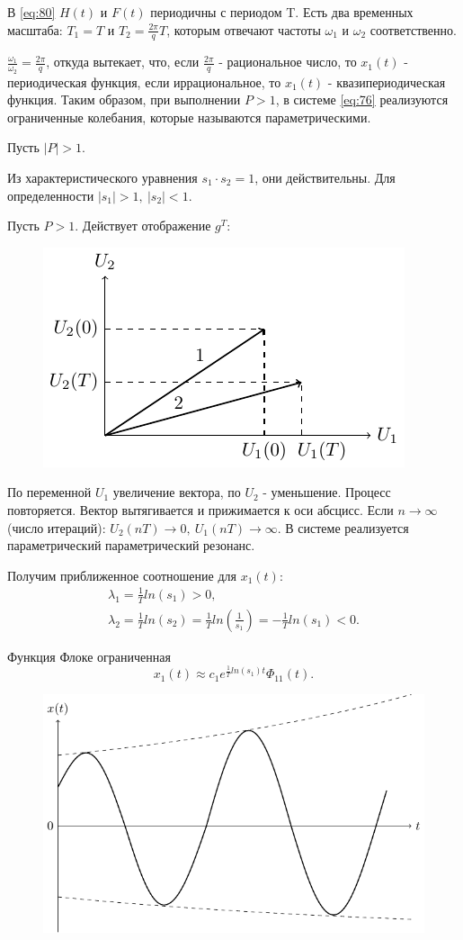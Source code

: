 В \eqref{eq:80} $H(t)$ и $F(t)$ периодичны с периодом T. Есть два временных масштаба: $T_1=T$ и $T_2=\frac{2\pi}{q}T$, которым отвечают частоты $\omega_1$ и $\omega_2$ соответственно.

$\frac{\omega_1}{\omega_2}=\frac{2\pi}{q}$, откуда вытекает, что, если $\frac{2\pi}{q}$ - рациональное число, то $x_1(t)$ - периодическая функция, если иррациональное, то $x_1(t)$ - квазипериодическая функция. Таким образом, при выполнении $P>1$, в системе \eqref{eq:76} реализуются ограниченные колебания, которые называются параметрическими.

Пусть $|P|>1$.

Из характеристического уравнения $s_1 \cdot s_2=1$, они действительны. Для определенности $|s_1|>1,~ |s_2|<1$.

Пусть $P>1$. Действует отображение $g^T$:
\begin{figure}[H]
	\centering
	\includegraphics[width=0.35\linewidth]{fig/fig41.pdf}   
\end{figure}

По переменной $U_1$ увеличение вектора, по $U_2$ - уменьшение. Процесс повторяется. Вектор вытягивается и прижимается к оси абсцисс. Если $n\rightarrow \infty$ (число итераций): $U_2(nT)\rightarrow 0,~U_1(nT)\rightarrow \infty$. В системе реализуется параметрический параметрический резонанс. 

Получим приближенное соотношение для $x_1(t)$:
\begin{gather*}
	\lambda_1=\frac{1}{T}ln(s_1)>0, \\
	\lambda_2=\frac{1}{T}ln(s_2)=\frac{1}{T}ln(\frac{1}{s_1})=-\frac{1}{T}ln(s_1)<0.
\end{gather*}

Функция Флоке ограниченная
\begin{equation*}
	x_1(t)\approx c_1 e^{\frac{1}{T}ln(s_1)t}\Phi_{11}(t).
\end{equation*}
\begin{figure}[H]
	\centering
	\includegraphics[width=0.5\linewidth]{fig/fig42.pdf}   
\end{figure}

